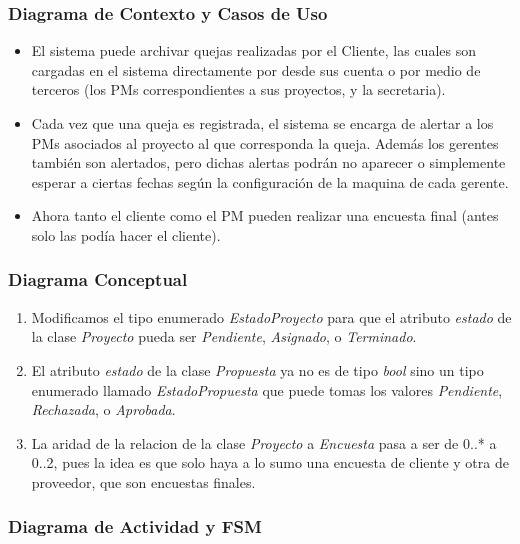\documentclass{article}
\theoremstyle{definition}
\theoremstyle{remark}
\begin{document}
\subsubsection{Diagrama de Contexto y Casos de Uso}
\begin{itemize}
    \item El sistema puede archivar quejas realizadas por el Cliente, las cuales son cargadas en el sistema directamente por desde sus cuenta o por medio de terceros (los PMs correspondientes a sus proyectos, y la secretaria).
    \item Cada vez que una queja es registrada, el sistema se encarga de alertar a los PMs asociados al proyecto al que corresponda la queja. Además los gerentes también son alertados, pero dichas alertas podrán no aparecer o simplemente esperar a ciertas fechas según la configuración de la maquina de cada gerente.
    \item Ahora tanto el cliente como el PM pueden realizar una encuesta final (antes solo las podía hacer el cliente).
\end{itemize}

\subsubsection{Diagrama Conceptual}

\begin{enumerate}

    \item Modificamos el tipo enumerado \textit{EstadoProyecto} para que el atributo \textit{estado} de la clase \textit{Proyecto} pueda ser \textit{Pendiente}, \textit{Asignado}, o \textit{Terminado}.
    
    \item El atributo \textit{estado} de la clase \textit{Propuesta} ya no es de tipo \textit{bool} sino un tipo enumerado llamado \textit{EstadoPropuesta} que puede tomas los valores \textit{Pendiente}, \textit{Rechazada}, o \textit{Aprobada}.
    
    \item La aridad de la relacion de la clase \textit{Proyecto} a \textit{Encuesta} pasa a ser de 0..* a 0..2, pues la idea es que solo haya a lo sumo una encuesta de cliente y otra de proveedor, que son encuestas finales.
    
    
\end{enumerate}

\subsubsection{Diagrama de Actividad y FSM}
\end{document}

